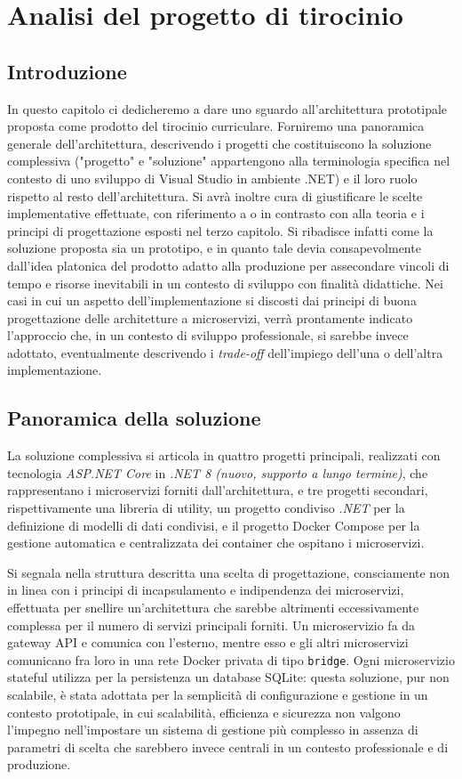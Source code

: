 \chapter{Analisi del progetto di tirocinio}
\section{Introduzione}
In questo capitolo ci dedicheremo a dare uno sguardo all'architettura prototipale proposta come prodotto del tirocinio curriculare. Forniremo una panoramica generale dell'architettura, descrivendo i progetti che costituiscono la soluzione complessiva ("progetto" e "soluzione" appartengono alla terminologia specifica nel contesto di uno sviluppo di Visual Studio in ambiente .NET) e il loro ruolo rispetto al resto dell'architettura. Si avrà inoltre cura di giustificare le scelte implementative effettuate, con riferimento a o in contrasto con alla teoria e i principi di progettazione esposti nel terzo capitolo. Si ribadisce infatti come la soluzione proposta sia un prototipo, e in quanto tale devia consapevolmente dall'idea platonica del prodotto adatto alla produzione per assecondare vincoli di tempo e risorse inevitabili in un contesto di sviluppo con finalità didattiche. Nei casi in cui un aspetto dell'implementazione si discosti dai principi di buona progettazione delle architetture a microservizi, verrà prontamente indicato l'approccio che, in un contesto di sviluppo professionale, si sarebbe invece adottato, eventualmente descrivendo i \emph{trade-off} dell'impiego dell'una o dell'altra implementazione.

\section{Panoramica della soluzione}
La soluzione complessiva si articola in quattro progetti principali, realizzati con tecnologia \emph{ASP.NET Core} in \emph{.NET 8 \emph{(nuovo, supporto a lungo termine)}}, che rappresentano i microservizi forniti dall'architettura, e tre progetti secondari, rispettivamente una libreria di utility, un progetto condiviso \emph{.NET} per la definizione di modelli di dati condivisi, e il progetto Docker Compose per la gestione automatica e centralizzata dei container che ospitano i microservizi.

Si segnala nella struttura descritta una scelta di progettazione, consciamente non in linea con i principi di incapsulamento e indipendenza dei microservizi, effettuata per snellire un'architettura che sarebbe altrimenti eccessivamente complessa per il numero di servizi principali forniti. Un microservizio fa da gateway API e comunica con l'esterno, mentre esso e gli altri microservizi comunicano fra loro in una rete Docker privata di tipo \texttt{bridge}. Ogni microservizio stateful utilizza per la persistenza un database SQLite: questa soluzione, pur non scalabile, è stata adottata per la semplicità di configurazione e gestione in un contesto prototipale, in cui scalabilità, efficienza e sicurezza non valgono l'impegno nell'impostare un sistema di gestione più complesso in assenza di parametri di scelta che sarebbero invece centrali in un contesto professionale e di produzione.

